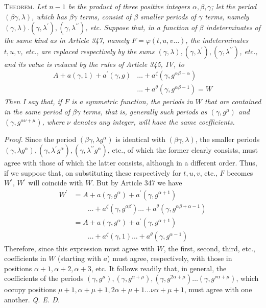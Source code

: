 \textsc{Theorem.} \textit{Let \(n-1\) be the product of three positive integers \(\alpha,\allowbreak \beta,\allowbreak \gamma\); let} \textit{the period \((\beta\gamma,\lambda)\), which has \(\beta\gamma\) terms, consist of \(\beta\) smaller periods of \(\gamma\) terms,} \textit{namely \((\gamma,\lambda).(\gamma,\lambda^{\prime}),\allowbreak (\gamma,\lambda^{\prime\prime})\), etc. Suppose that, in a function of \(\beta\) indeterminates} \textit{of the same kind as in Article 347, namely \(F=\varphi(t,u,v\ldots)\), the indeterminates \(t,\allowbreak u,\allowbreak v\), etc.,} \textit{are replaced respectively by the sums \((\gamma,\lambda),\allowbreak (\gamma,\lambda^{\prime}),\allowbreak (\gamma,\lambda^{\prime\prime})\), etc., and its value is reduced by the rules of} \textit{Article 345, IV, to} \[\begin{aligned}
A+a(\gamma,1)+a^{\prime}(\gamma,g)&\ldots+a^\zeta(\gamma,g^{\alpha\beta-\alpha})\\
&\ldots+a^\theta(\gamma,g^{\alpha\beta-1})=W
\end{aligned}\] \textit{Then I say that, if \(F\) is a symmetric function, the periods in \(W\) that are contained in the same period} \textit{of \(\beta\gamma\) terms, \textit{that is}, generally such periods as \((\gamma,g^\mu)\) and \((\gamma,g^{\alpha\nu+\mu})\), where} \textit{\(\nu\) denotes any integer, will have the same coefficients.}

\textit{Proof.} Since the period \((\beta\gamma,\lambda g^\alpha)\) is identical with \((\beta\gamma,\lambda)\), the smaller periods \((\gamma,\lambda g^\alpha),\allowbreak (\gamma,\lambda^{\prime}g^\alpha),\allowbreak (\gamma,\lambda^{\prime\prime}g^\alpha)\), etc., of which the former clearly consists, must agree with those of which the latter consists, although in a different order. Thus, if we suppose that, on substituting these respectively for \(t,\allowbreak u,\allowbreak v\), etc., \(F\) becomes \(W^{\prime}\), \(W^{\prime}\) will coincide with \(W\). But by Article 347 we have \[\begin{aligned}
W^{\prime}&=A+a(\gamma,g^\alpha)+a^{\prime}(\gamma,g^{\alpha+1})\\
&\qquad\ldots+a^\zeta(\gamma,g^{\alpha\beta})\ldots+a^\theta(\gamma,g^{\alpha\beta+\alpha-1})\\
&=A+a(\gamma,g^\alpha)+a^{\prime}(\gamma,g^{\alpha+1})\\
&\qquad\ldots+a^\zeta(\gamma,1)\ldots+a^\theta(\gamma,g^{\alpha-1})
\end{aligned}\] Therefore, since this expression must agree with \(W\), the first, second, third, etc., coefficients in \(W\) (starting with \(a\)) must agree, respectively, with those in positions \(\alpha+1,\allowbreak \alpha+2,\allowbreak \alpha+3\), etc. It follows readily that, in general, the coefficients of the periods \((\gamma,g^\mu),\allowbreak (\gamma,g^{\alpha+\mu}),\allowbreak (\gamma,g^{2\alpha+\mu})\ldots(\gamma,g^{\nu\alpha+\mu})\), which occupy positions \(\mu+1,\allowbreak \alpha+\mu+1,\allowbreak 2\alpha+\mu+1\ldots\nu\alpha+\mu+1\), must agree with one another. \textit{Q. E. D.}

